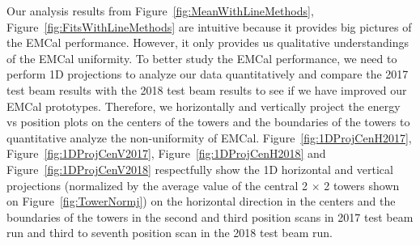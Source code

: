 \documentclass[hidelinks,11pt]{article}
\numberwithin{figure}{section}
\numberwithin{table}{section}
\begin{document}
Our analysis results from Figure~\ref{fig:MeanWithLineMethods}, Figure~\ref{fig:FitsWithLineMethods} are intuitive because it provides big pictures of the EMCal performance. However, it only provides us qualitative understandings of the EMCal uniformity. To better study the EMCal performance, we need to perform 1D projections to analyze our data quantitatively and compare the 2017 test beam results with the 2018 test beam results to see if we have improved our EMCal prototypes. Therefore, we horizontally and vertically project the energy vs position plots on the centers of the towers and the boundaries of the towers to quantitative analyze the non-uniformity of EMCal. Figure~\ref{fig:1DProjCenH2017}, Figure~\ref{fig:1DProjCenV2017}, Figure~\ref{fig:1DProjCenH2018} and Figure~\ref{fig:1DProjCenV2018} respectfully show the 1D horizontal and vertical projections (normalized by the average value of the central 2 $\times$ 2 towers shown on Figure~\ref{fig:TowerNormj}) on the horizontal direction in the centers and the boundaries of the towers in the second and third position scans in 2017 test beam run and third to seventh position scan in the 2018 test beam run. 
\end{document}
